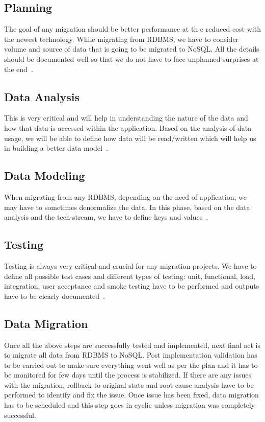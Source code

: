 \subsection{Planning}  

The goal of any migration should be better performance at th
e reduced cost with the newest technology. While migrating 
from RDBMS, we have to consider volume and source of data 
that is going to be migrated to NoSQL. All the details 
should be documented well so that we do not have to face 
unplanned surprises at the end~\cite{hid-sp18-710-mongrdbms}.

\subsection{Data Analysis} 

This is very critical and will help in understanding the nature
of the data and how that data is accessed within the application. 
Based on the analysis of data usage, we will be able to define 
how data will be read/written which will help us in building a 
better data model~\cite{hid-sp18-710-mongrdbms}.

\subsection{Data Modeling} 

When migrating from any RDBMS, depending on the need of application, 
we may have to sometimes denormalize the data. In this phase, 
based on the data analysis and the tech-stream, we have to 
define keys and values~\cite{hid-sp18-710-aws}.

\subsection{Testing} 

Testing is always very critical and crucial for any migration projects.
We have to define all possible test cases and different types of testing: 
unit, functional, load, integration, user acceptance and smoke 
testing have to be performed and outputs have to be clearly
documented~\cite{hid-sp18-710-aws}.

\subsection{Data Migration} 

Once all the above steps are successfully tested and implemented,
next final act is to migrate all data from RDBMS to NoSQL. Post
implementation validation has to be carried out to make sure 
everything went well as per the plan and it has to be monitored
for few days until the process is stabilized. If there are any
issues with the migration, rollback to original state and root
cause analysis have to be performed to identify and fix the issue. 
Once issue has been fixed, data migration has to be scheduled and
this step goes in cyclic unless migration was completely successful. 

